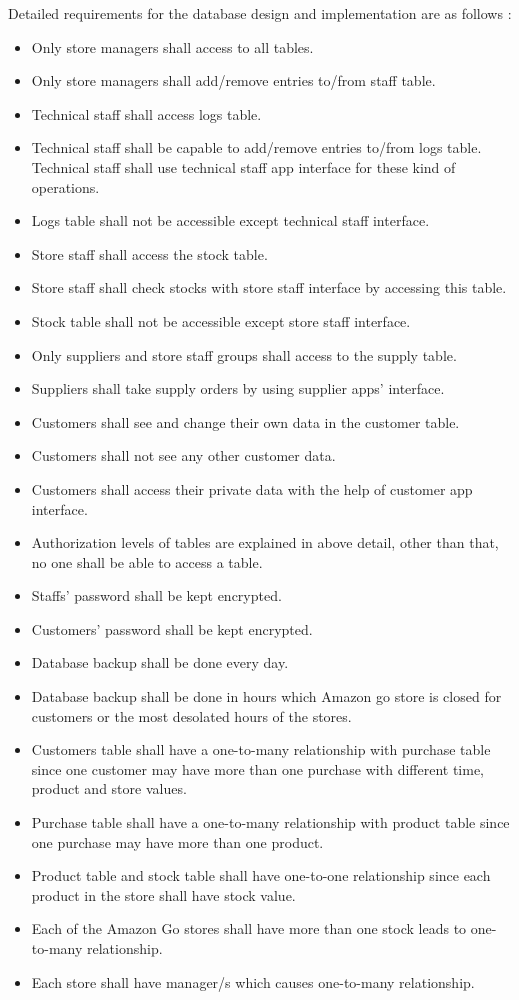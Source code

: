 Detailed requirements for the database design and implementation are as follows :
\begin{itemize}
    \item Only store managers shall access to all tables.
    \item Only store managers shall add/remove entries to/from staff table.
    \item Technical staff shall access logs table.
    \item Technical staff shall be capable to add/remove entries to/from logs table. Technical staff shall use technical staff app interface for these kind of operations.
    \item Logs table shall not be accessible except technical staff interface.
    \item Store staff shall access the stock table.
    \item Store staff shall check stocks with store staff interface by accessing this table.
    \item Stock table shall not be accessible except store staff interface.
    \item Only suppliers and store staff groups shall access to the supply table.
    \item Suppliers shall take supply orders by using supplier apps' interface.
    \item Customers shall see and change their own data in the customer table.
    \item Customers shall not see any other customer data.
    \item Customers shall access their private data with the help of customer app interface.
    \item Authorization levels of tables are explained in above detail, other than that, no one shall be able to access a table.
    \item Staffs' password shall be kept encrypted.
    \item Customers' password shall be kept encrypted.
    \item Database backup shall be done every day.
    \item Database backup shall be done in hours which Amazon go store is closed for customers or the most desolated hours of the stores.
    \item Customers table shall have a one-to-many relationship with purchase table since one customer may have more than one purchase with different time, product and store values.
    \item Purchase table shall have a one-to-many relationship with product table since one purchase may have more than one product.
    \item Product table and stock table shall have one-to-one relationship since each product in the store shall have stock value.
    \item Each of the Amazon Go stores shall have more than one stock leads to one-to-many relationship.
    \item Each store shall have manager/s which causes one-to-many relationship.
\end{itemize}

